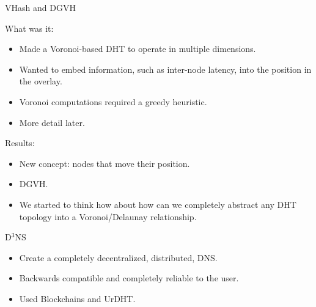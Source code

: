 \documentclass[11pt]{beamer}
\begin{document}


\begin{frame}{VHash and DGVH}



What was it:
\begin{itemize}
	\item Made a Voronoi-based DHT to operate in multiple dimensions.
	\item Wanted to embed information, such as inter-node latency, into the position in the overlay.
	\item Voronoi computations required a greedy heuristic.
	\item More detail later.
\end{itemize}


Results:
\begin{itemize}
	\item New concept: nodes that move their position.
	\item DGVH.
	\item We started to think how about how can we completely abstract any DHT topology into a Voronoi/Delaunay relationship.
\end{itemize}

\end{frame}


\begin{frame}{D$^3$NS}

\begin{itemize}
	\item Create a completely decentralized, distributed, DNS.
	\item Backwards compatible and completely reliable to the user.
	\item Used Blockchains and UrDHT.
\end{itemize}
\end{frame}
\end{document}
